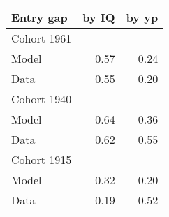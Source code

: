 \begin{tabular}{lrr}
\hline
Entry gap & by IQ  & by yp  \\
\hline
Cohort 1961 &   &   \\
Model & 0.57  & 0.24  \\
Data & 0.55  & 0.20  \\
Cohort 1940 &   &   \\
Model & 0.64  & 0.36  \\
Data & 0.62  & 0.55  \\
Cohort 1915 &   &   \\
Model & 0.32  & 0.20  \\
Data & 0.19  & 0.52  \\
\hline
\end{tabular}%
